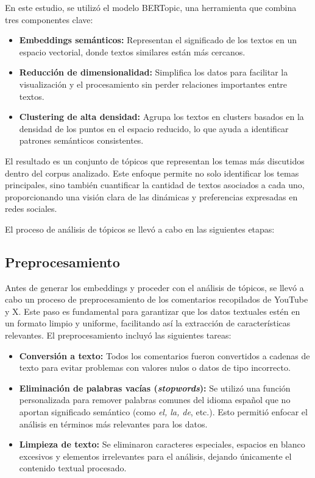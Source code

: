\documentclass[10pt, a4paper]{article}
\begin{document}
	En este estudio, se utilizó el modelo BERTopic, una herramienta que combina tres componentes clave:
	\begin{itemize}
		\item \textbf{Embeddings semánticos:} Representan el significado de los textos en un espacio vectorial, donde textos similares están más cercanos.
		\item \textbf{Reducción de dimensionalidad:} Simplifica los datos para facilitar la visualización y el procesamiento sin perder relaciones importantes entre textos.
		\item \textbf{Clustering de alta densidad:} Agrupa los textos en clusters basados en la densidad de los puntos en el espacio reducido, lo que ayuda a identificar patrones semánticos consistentes.
	\end{itemize}
	
	El resultado es un conjunto de tópicos que representan los temas más discutidos dentro del corpus analizado. Este enfoque permite no solo identificar los temas principales, sino también cuantificar la cantidad de textos asociados a cada uno, proporcionando una visión clara de las dinámicas y preferencias expresadas en redes sociales.
	
	El proceso de análisis de tópicos se llevó a cabo en las siguientes etapas:
	
	
	\subsection{Preprocesamiento}
	Antes de generar los embeddings y proceder con el análisis de tópicos, se llevó a cabo un proceso de preprocesamiento de los comentarios recopilados de YouTube y X. Este paso es fundamental para garantizar que los datos textuales estén en un formato limpio y uniforme, facilitando así la extracción de características relevantes. El preprocesamiento incluyó las siguientes tareas:
	
	\begin{itemize}
		\item \textbf{Conversión a texto:} Todos los comentarios fueron convertidos a cadenas de texto para evitar problemas con valores nulos o datos de tipo incorrecto.
		\item \textbf{Eliminación de palabras vacías (\textit{stopwords}):} Se utilizó una función personalizada para remover palabras comunes del idioma español que no aportan significado semántico (como \textit{el, la, de}, etc.). Esto permitió enfocar el análisis en términos más relevantes para los datos.
		\item \textbf{Limpieza de texto:} Se eliminaron caracteres especiales, espacios en blanco excesivos y elementos irrelevantes para el análisis, dejando únicamente el contenido textual procesado.
	\end{itemize}
	
\end{document}
